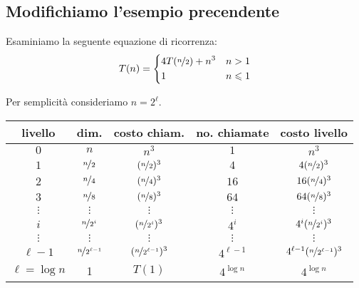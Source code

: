 \clearpage
\subsection*{Modifichiamo l'esempio precendente}

Esaminiamo la seguente equazione di ricorrenza:
\[
T(n) =
\begin{dcases}
	4T(\nicefrac{n}{2}) + n^3 & n > 1 \\
	1 & n \leqslant 1
\end{dcases}
\]

Per semplicità consideriamo \(n = 2^{\ell}\).
\begin{center}
\begin{tabular}{@{} *{5}{c} @{}}
	\toprule
		livello & dim. & costo chiam. & no. chiamate & costo livello \\
	\midrule
		\(0\) & \(n\)   & \(n^3\)     & \(1\)  & \(n^3\) \\
	\addlinespace
		\(1\) & \(\nicefrac{n}{2}\) & \((\nicefrac{n}{2})^3\) & \(4\)  & \(4(\nicefrac{n}{2})^3\)\\
	\addlinespace
		\(2\) & \(\nicefrac{n}{4}\) & \((\nicefrac{n}{4})^3\) & \(16\) & \(16(\nicefrac{n}{4})^3\)\\
	\addlinespace
		\(3\) & \(\nicefrac{n}{8}\) & \((\nicefrac{n}{8})^3\) & \(64\) & \(64(\nicefrac{n}{8})^3\)\\
	\addlinespace
		\(\vdots\) & \(\vdots\) & \(\vdots\) & \(\vdots\) & \(\vdots\) \\
	\addlinespace
		\(i\) & \(\nicefrac{n}{2^i}\) & \((\nicefrac{n}{2^i})^3\) & \(4^i\) & \(4^i (\nicefrac{n}{2^i})^3\) \\
	\addlinespace
		\(\vdots\) & \(\vdots\) & \(\vdots\) & \(\vdots\) & \(\vdots\) \\
	\addlinespace
		\({\ell-1}\) & \(\nicefrac{n}{2^{\ell-1}}\) & \((\nicefrac{n}{2^{\ell-1}})^3\) & \(4^{\ell-1}\) & \(4^{\ell-1} (\nicefrac{n}{2^{\ell-1}})^3\) \\
	\addlinespace
		\(\ell = \log n\) & 1 & \(T(1)\) & \(4^{\log n}\) & \(4^{\log n}\) \\
	\bottomrule
\end{tabular}
\end{center}


